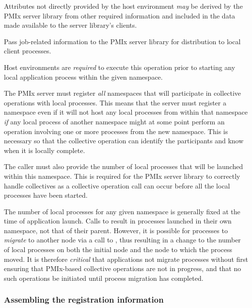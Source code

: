 Attributes not directly provided by the host environment \textit{may} be derived by the \ac{PMIx} server library from other required information and included in the data made available to the server library's clients.

\optattrend

\descr

Pass job-related information to the \ac{PMIx} server library for distribution to local client processes.

\advicermstart
Host environments are \textit{required} to execute this operation prior to starting any local application process within the given namespace.

The \ac{PMIx} server must register \emph{all} namespaces that will participate in collective operations with local processes.
This means that the server must register a namespace even if it will not host any local processes from within that namespace \emph{if} any local process of another namespace might at some point perform an operation involving one or more processes from the new namespace.
This is necessary so that the collective operation can identify the participants and know when it is locally complete.

The caller must also provide the number of local processes that will be launched within this namespace.
This is required for the \ac{PMIx} server library to correctly handle collectives as a collective operation call can occur before all the local processes have been started.
\advicermend

\adviceuserstart
The number of local processes for any given namespace is generally fixed at the time of application launch. Calls to  result in processes launched in their own namespace, not that of their parent. However, it is possible for processes to \textit{migrate} to another node via a call to , thus resulting in a change to the number of local processes on both the initial node and the node to which the process moved. It is therefore \textit{critical} that applications not migrate processes without first ensuring that \ac{PMIx}-based collective operations are not in progress, and that no such operations be initiated until process migration has completed.
\adviceuserend


\subsubsection{Assembling the registration information}
\label{chap:api_server:assemble}

